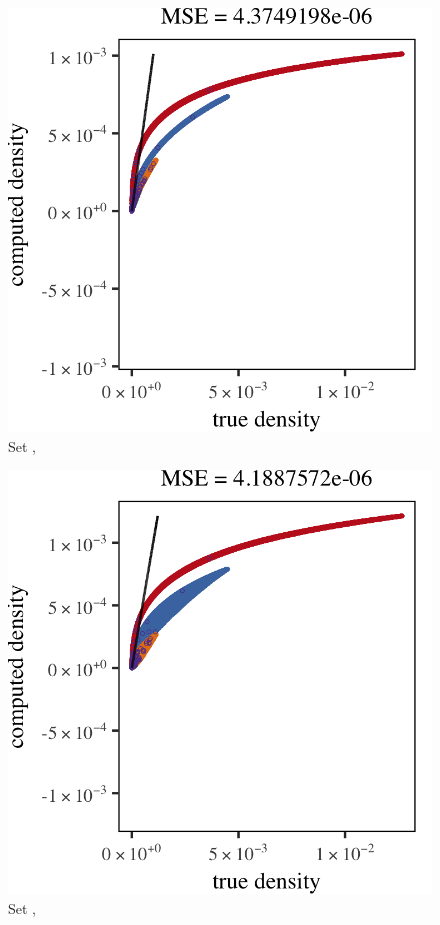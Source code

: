 \begin{subfigure}{0.23\textwidth}
	\centering
	\includegraphics[keepaspectratio=true, width=\textwidth, height=0.23\textheight]{result/img/all/results_ferdosi_3_120000_mbe_silverman.png}
	\caption{Set \ferdosiThree, \mbe}
	\label{fig:4:results:mbe:ferdosi3}
\end{subfigure}
\begin{subfigure}{0.23\textwidth}
	\centering
	\includegraphics[keepaspectratio=true, width=\textwidth, height=0.23\textheight]{result/img/all/results_baakman_3_120000_mbe_silverman}
	\caption{Set \baakmanThree, \mbe}
	\label{fig:4:results:mbe:baakman3}
\end{subfigure}	
